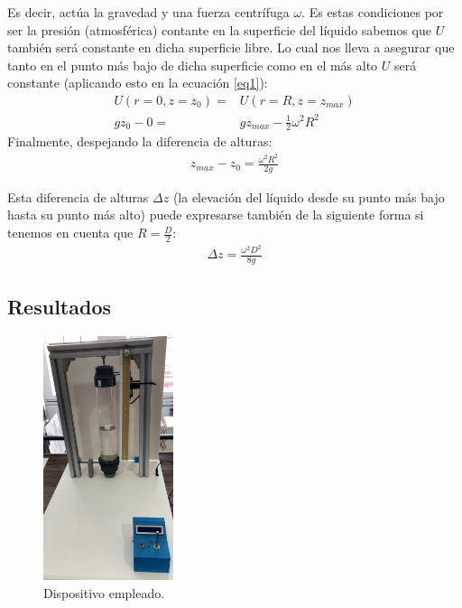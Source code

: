 \documentclass[12pt,a4paper]{article}
\begin{document}
Es decir, actúa la gravedad y una fuerza centrífuga $\omega$.
Es estas condiciones por ser la presión (atmosférica) contante en la superficie del líquido sabemos que $U$ también será constante en dicha superficie libre. Lo cual nos lleva a asegurar que tanto en el punto más bajo de dicha superficie como en el más alto $U$ será constante (aplicando esto en la ecuación \ref{eq1}):
\begin{align*}
U(r=0,z=z_{0})= & U(r=R,z=z_{max})\\
gz_{0}-0= & gz_{max}-\frac{1}{2}\omega^2 R^2
\end{align*}
Finalmente, despejando la diferencia de alturas:
\begin{align*}
z_{max}-z_{0}=\frac{\omega^2 R^2}{2g}
\end{align*}


Esta diferencia de alturas $\Delta z$ (la elevación del líquido desde su punto más bajo hasta su punto más alto) puede expresarse también de la siguiente forma si tenemos en cuenta que $R=\frac{D}{2}$:
\begin{align}
\boxed{\Delta z =\frac{\omega^2 D^2}{8g}}
\label{eq2}
\end{align}

\vspace{-0.3cm}
\subsection*{Resultados}

\begin{figure}
\vspace{-0.6cm}
 	 \begin{center}
  \includegraphics[width=0.34\textwidth]{fotos/aparato_3}
  	 \end{center}
  	 \vspace{-0.5cm}
  	\caption{Dispositivo empleado.}
  	\label{fig7}
\end{figure}
\end{document}
